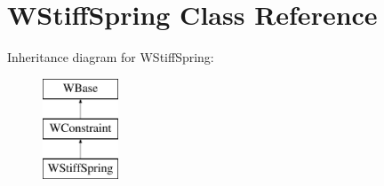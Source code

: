 \hypertarget{class_w_stiff_spring}{}\section{W\+Stiff\+Spring Class Reference}
\label{class_w_stiff_spring}
Inheritance diagram for W\+Stiff\+Spring\+:\begin{figure}[H]
\begin{center}
\leavevmode
\includegraphics[height=3.000000cm]{class_w_stiff_spring}
\end{center}
\end{figure}
